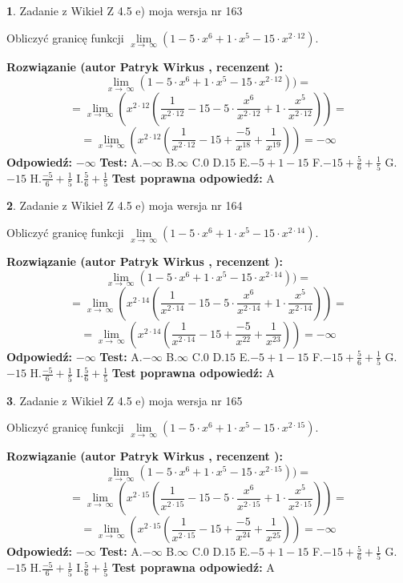 \documentclass[12pt, a4paper]{article}
\theoremstyle{definition} %
\newtheorem{zad}{}
\newcommand{\zadStart}[1]{\begin{zad}#1\newline}
\newcommand{\zadStop}{\end{zad}}
\newcommand{\rozwStart}[2]{\noindent \textbf{Rozwiązanie (autor #1 , recenzent #2): }\newline}
\newcommand{\rozwStop}{\newline}
\newcommand{\odpStart}{\noindent \textbf{Odpowiedź:}\newline}
\newcommand{\odpStop}{\newline}
\newcommand{\testStart}{\noindent \textbf{Test:}\newline}
\newcommand{\testStop}{\newline}
\newcommand{\kluczStart}{\noindent \textbf{Test poprawna odpowiedź:}\newline}
\newcommand{\kluczStop}{\newline}
\begin{document}
\zadStart{Zadanie z Wikieł Z 4.5 e) moja wersja nr 163}



Obliczyć granicę funkcji  $\lim\limits_{x\to\ \infty}(1 - 5 \cdot x^{6}+1 \cdot x^{5}- 15 \cdot x^{2\cdot12})$.
\zadStop
\rozwStart{Patryk Wirkus}{}
$$\lim\limits_{x\to\ \infty}(1 - 5 \cdot x^{6}+1 \cdot x^{5}- 15 \cdot x^{2\cdot12}))=$$
$$=\lim\limits_{x\to\ \infty}(x^{2\cdot12}(\frac{1}{x^{2\cdot12}}-15 -5 \cdot \frac{x^{6}}{x^{2\cdot12}}+1 \cdot \frac{x^{5}}{x^{2\cdot12}}))=$$
$$=\lim\limits_{x\to\ \infty}(x^{2\cdot12}(\frac{1}{x^{2\cdot12}}-15 + \frac{-5}{x^{18}}+ \frac{1}{x^{19}}))=-\infty$$
\rozwStop
\odpStart
$-\infty$
\odpStop
\testStart
A.$-\infty$ B.$\infty$ C.$0$ D.$15$ E.$-5 + 1 - 15$
F.$-15+\frac{5}{6}+\frac{1}{5}$ G.$-15$
H.$\frac{-5}{6}+\frac{1}{5}$
I.$\frac{5}{6}+\frac{1}{5}$
\testStop
\kluczStart
A
\kluczStop



\zadStart{Zadanie z Wikieł Z 4.5 e) moja wersja nr 164}



Obliczyć granicę funkcji  $\lim\limits_{x\to\ \infty}(1 - 5 \cdot x^{6}+1 \cdot x^{5}- 15 \cdot x^{2\cdot14})$.
\zadStop
\rozwStart{Patryk Wirkus}{}
$$\lim\limits_{x\to\ \infty}(1 - 5 \cdot x^{6}+1 \cdot x^{5}- 15 \cdot x^{2\cdot14}))=$$
$$=\lim\limits_{x\to\ \infty}(x^{2\cdot14}(\frac{1}{x^{2\cdot14}}-15 -5 \cdot \frac{x^{6}}{x^{2\cdot14}}+1 \cdot \frac{x^{5}}{x^{2\cdot14}}))=$$
$$=\lim\limits_{x\to\ \infty}(x^{2\cdot14}(\frac{1}{x^{2\cdot14}}-15 + \frac{-5}{x^{22}}+ \frac{1}{x^{23}}))=-\infty$$
\rozwStop
\odpStart
$-\infty$
\odpStop
\testStart
A.$-\infty$ B.$\infty$ C.$0$ D.$15$ E.$-5 + 1 - 15$
F.$-15+\frac{5}{6}+\frac{1}{5}$ G.$-15$
H.$\frac{-5}{6}+\frac{1}{5}$
I.$\frac{5}{6}+\frac{1}{5}$
\testStop
\kluczStart
A
\kluczStop



\zadStart{Zadanie z Wikieł Z 4.5 e) moja wersja nr 165}



Obliczyć granicę funkcji  $\lim\limits_{x\to\ \infty}(1 - 5 \cdot x^{6}+1 \cdot x^{5}- 15 \cdot x^{2\cdot15})$.
\zadStop
\rozwStart{Patryk Wirkus}{}
$$\lim\limits_{x\to\ \infty}(1 - 5 \cdot x^{6}+1 \cdot x^{5}- 15 \cdot x^{2\cdot15}))=$$
$$=\lim\limits_{x\to\ \infty}(x^{2\cdot15}(\frac{1}{x^{2\cdot15}}-15 -5 \cdot \frac{x^{6}}{x^{2\cdot15}}+1 \cdot \frac{x^{5}}{x^{2\cdot15}}))=$$
$$=\lim\limits_{x\to\ \infty}(x^{2\cdot15}(\frac{1}{x^{2\cdot15}}-15 + \frac{-5}{x^{24}}+ \frac{1}{x^{25}}))=-\infty$$
\rozwStop
\odpStart
$-\infty$
\odpStop
\testStart
A.$-\infty$ B.$\infty$ C.$0$ D.$15$ E.$-5 + 1 - 15$
F.$-15+\frac{5}{6}+\frac{1}{5}$ G.$-15$
H.$\frac{-5}{6}+\frac{1}{5}$
I.$\frac{5}{6}+\frac{1}{5}$
\testStop
\kluczStart
A
\kluczStop
\end{document}
